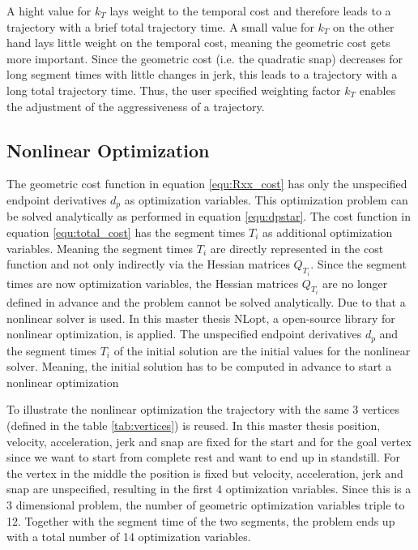 A hight value for $k_T$ lays weight to the temporal cost and therefore leads to a trajectory with a brief total trajectory time. A small value for $k_T$ on the other hand lays little weight on the temporal cost, meaning the geometric cost gets more important. Since the geometric cost (i.e. the quadratic snap) decreases for long segment times with little changes in jerk, this leads to a trajectory with a long total trajectory time. Thus, the user specified weighting factor $k_T$ enables the adjustment of the aggressiveness of a trajectory. \newline

\subsection{Nonlinear Optimization}\label{sec:nonlinearopt}

The geometric cost function in equation \ref{equ:Rxx_cost} has only the unspecified endpoint derivatives $d_p$ as optimization variables. This optimization problem can be solved analytically as performed in equation \ref{equ:dpstar}. The cost function in equation \ref{equ:total_cost} has the segment times $T_i$ as additional optimization variables. Meaning the segment times $T_i$ are directly represented in the cost function and not only indirectly via the Hessian matrices $Q_{T_i}$. Since the segment times are now optimization variables, the Hessian matrices $Q_{T_i}$ are no longer defined in advance and the problem cannot be solved analytically. Due to that a nonlinear solver is used. In this master thesis NLopt, a open-source library for nonlinear optimization, is applied. The unspecified endpoint derivatives $d_p$ and the segment times $T_i$ of the initial solution are the initial values for the nonlinear solver. Meaning, the initial solution has to be computed in advance to start a nonlinear optimization \newline

To illustrate the nonlinear optimization the trajectory with the same 3 vertices (defined in the table  \ref{tab:vertices}) is reused. In this master thesis position, velocity, acceleration, jerk and snap are fixed for the start and for the goal vertex since we want to start from complete rest and want to end up in standstill. For the vertex in the middle the position is fixed but velocity, acceleration, jerk and snap are unspecified, resulting in the first 4 optimization variables. Since this is a 3 dimensional problem, the number of geometric optimization variables triple to 12. Together with the segment time of the two segments, the problem ends up with a total number of 14 optimization variables. \pagebreak 

